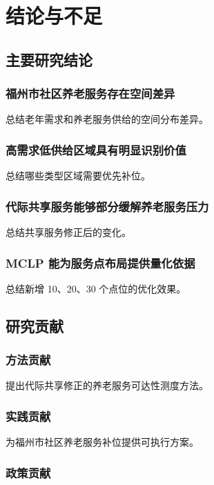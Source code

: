 \section{结论与不足}

\subsection{主要研究结论}

\subsubsection{福州市社区养老服务存在空间差异}

总结老年需求和养老服务供给的空间分布差异。

\subsubsection{高需求低供给区域具有明显识别价值}

总结哪些类型区域需要优先补位。

\subsubsection{代际共享服务能够部分缓解养老服务压力}

总结共享服务修正后的变化。

\subsubsection{MCLP 能为服务点布局提供量化依据}

总结新增 10、20、30 个点位的优化效果。

\subsection{研究贡献}

\subsubsection{方法贡献}

提出代际共享修正的养老服务可达性测度方法。

\subsubsection{实践贡献}

为福州市社区养老服务补位提供可执行方案。

\subsubsection{政策贡献}

